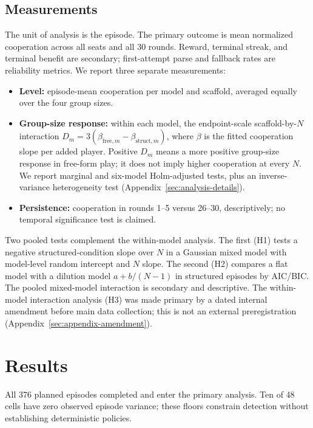 \documentclass[11pt]{article}
\begin{document}
\subsection{Measurements}
The unit of analysis is the episode. The primary outcome is mean normalized cooperation across all seats and all 30 rounds. Reward, terminal streak, and terminal benefit are secondary; first-attempt parse and fallback rates are reliability metrics. We report three separate measurements:
\begin{itemize}
\item \textbf{Level:} episode-mean cooperation per model and scaffold, averaged equally over the four group sizes.
\item \textbf{Group-size response:} within each model, the endpoint-scale scaffold-by-$N$ interaction $D_m=3(\beta_{\mathrm{free},m}-\beta_{\mathrm{struct},m})$, where $\beta$ is the fitted cooperation slope per added player. Positive $D_m$ means a more positive group-size response in free-form play; it does not imply higher cooperation at every $N$. We report marginal and six-model Holm-adjusted tests, plus an inverse-variance heterogeneity test (Appendix~\ref{sec:analysis-details}).
\item \textbf{Persistence:} cooperation in rounds 1--5 versus 26--30, descriptively; no temporal significance test is claimed.
\end{itemize}
Two pooled tests complement the within-model analysis. The first (H1) tests a negative structured-condition slope over $N$ in a Gaussian mixed model with model-level random intercept and $N$ slope. The second (H2) compares a flat model with a dilution model $a+b/(N-1)$ in structured episodes by AIC/BIC. The pooled mixed-model interaction is secondary and descriptive. The within-model interaction analysis (H3) was made primary by a dated internal amendment before main data collection; this is not an external preregistration (Appendix~\ref{sec:appendix-amendment}).

\section{Results}
\label{sec:results}
All 376 planned episodes completed and enter the primary analysis. Ten of 48 cells have zero observed episode variance; these floors constrain detection without establishing deterministic policies.
\end{document}
